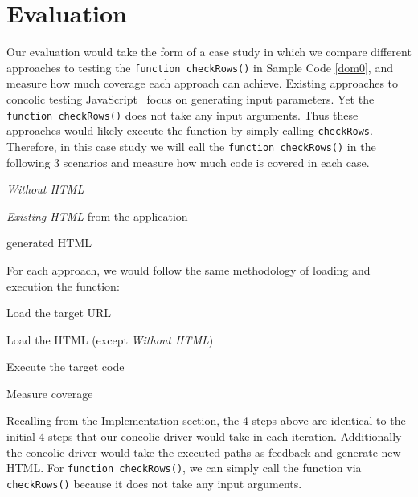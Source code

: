 \section{Evaluation}
Our evaluation would take the form of a case study in which we compare different approaches to testing the {\tt function checkRows()} in Sample Code \ref{dom0}, and measure how much coverage each approach can achieve.
Existing approaches to concolic testing JavaScript~\cite{kudzu, jalangi} focus on generating input parameters.  
Yet the {\tt function checkRows()} does not take any input arguments.  Thus these approaches would likely execute the function by simply calling {\tt checkRows}.
Therefore, in this case study we will call the {\tt function checkRows()} in the following 3 scenarios and measure how much code is covered in each case.  
\begin{compactitem}
\item {\em Without HTML}
\item {\em Existing HTML} from the application
\item \tool generated HTML
\end{compactitem}

For each approach, we would follow the same methodology of loading and execution the function:
\begin{compactitem}
\item Load the target URL
\item Load the HTML (except {\em Without HTML})
\item Execute the target code
\item Measure coverage
\end{compactitem}
Recalling from the Implementation section, the 4 steps above are identical to the initial 4 steps that our concolic driver would take in each iteration.  Additionally the concolic driver would take the executed paths as feedback and generate new HTML.  
For {\tt function checkRows()}, we can simply call the function via {\tt checkRows()} because it does not take any input arguments.

